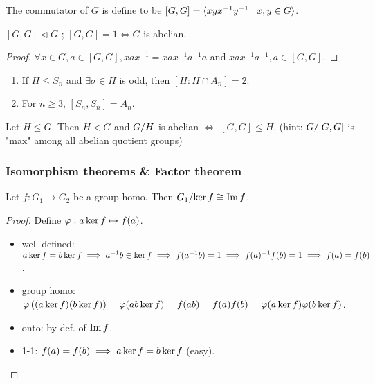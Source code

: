 \begin{definition}
  The commutator of $G$ is define to be $[G,G] = \langle xyx^{-1}y^{-1} \mid
  x,y \in G\rangle$.
\end{definition}

\begin{prop}
  $[G,G] \lhd G$ ; $[G,G] = 1 \iff G$ is abelian.
  \begin{proof}
    $\forall x \in G, a \in [G,G], xax^{-1} = xax^{-1}a^{-1}a$ and
    $xax^{-1}a^{-1}, a \in [G,G]$.
  \end{proof}
\end{prop}

\begin{exercise} \mbox{}
  \begin{enumerate}
    \item If $H \le S_n$ and $\exists \sigma \in H$ is odd, then $[H:H\cap A_n] = 2$.
    \item For $n \ge 3$, $[S_n, S_n] = A_n$.
  \end{enumerate}
\end{exercise}

\begin{exercise}
  Let $H \le G$. Then  $H \lhd G$ and ${G}/{H}$ is abelian $\iff$
  $[G,G] \le H$.
  (hint: ${G}/{[G,G]}$ is "max" among all abelian quotient groups)
\end{exercise}


\subsubsection{Isomorphism theorems \& Factor theorem}
\begin{theorem}
  Let $f: G_1 \to G_2$ be a group homo. Then ${G_1}/{\operatorname{ker} f} \cong \operatorname{Im} f$.
  \begin{proof}
    Define $\varphi: a \operatorname{ker} f \mapsto f(a)$.
    \begin{itemize}
      \item well-defined: $a \operatorname{ker} f = b \operatorname{ker} f \implies a^{-1}b \in \operatorname{ker} f
        \implies f(a^{-1}b) = 1 \implies f(a)^{-1}f(b) = 1 \implies f(a)=f(b)$.
      \item group homo: $\varphi\left((a \operatorname{ker} f)(b\operatorname{ker} f)\right) = 
        \varphi(ab \operatorname{ker} f) = f(ab) = f(a)f(b) =
        \varphi(a\operatorname{ker} f)\varphi(b\operatorname{ker} f)$.
      \item onto: by def. of $\operatorname{Im} f$.
      \item 1-1: $f(a) = f(b) \implies a \operatorname{ker} f = b \operatorname{ker} f$ (easy).
      \end{itemize}
  \end{proof}
\end{theorem}

